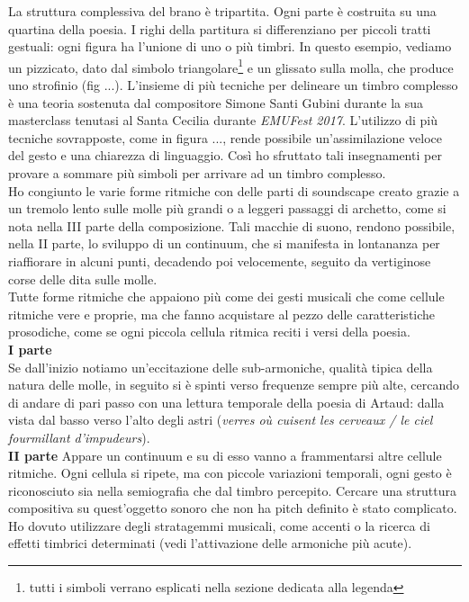 La struttura complessiva del brano è tripartita. Ogni parte è costruita su una quartina della poesia. I righi della partitura  si differenziano per piccoli tratti gestuali: ogni figura ha l'unione di uno o più timbri. In questo esempio, vediamo un pizzicato, dato dal simbolo triangolare\footnote{tutti i simboli verrano esplicati nella sezione dedicata alla legenda} e un glissato sulla molla, che produce uno strofinio (fig ...). L'insieme di più tecniche per delineare un timbro complesso è una teoria sostenuta dal compositore Simone Santi Gubini durante la sua masterclass tenutasi al Santa Cecilia durante \textit{EMUFest 2017}. L'utilizzo di più tecniche sovrapposte, come in figura ..., rende possibile un'assimilazione veloce del gesto e una chiarezza di linguaggio. Così ho sfruttato tali insegnamenti per provare a sommare più simboli per arrivare ad un timbro complesso. \\
Ho congiunto le varie forme ritmiche con delle parti di soundscape creato grazie a un tremolo lento sulle molle più grandi o a leggeri passaggi di archetto, come si nota nella III parte della composizione. Tali macchie di suono, rendono possibile, nella II parte, lo sviluppo di un continuum, che si manifesta in lontananza per riaffiorare in alcuni punti, decadendo poi velocemente, seguito da vertiginose corse delle dita sulle molle. \\
Tutte forme ritmiche che appaiono più come dei gesti musicali che come cellule ritmiche vere e proprie, ma che fanno acquistare al pezzo delle caratteristiche prosodiche, come se ogni piccola cellula ritmica reciti i versi della poesia. \\
\textbf{I parte} \\
Se dall'inizio notiamo un'eccitazione delle sub-armoniche, qualità tipica della natura delle molle, in seguito si è spinti verso frequenze sempre più alte, cercando di andare di pari passo con una lettura temporale della poesia di Artaud: dalla vista dal basso verso l'alto degli astri (\textit{verres où cuisent les cerveaux / le ciel fourmillant d'impudeurs}). \\
\textbf{II parte}
Appare un continuum e su di esso vanno a frammentarsi altre cellule ritmiche. Ogni cellula si ripete, ma con piccole variazioni temporali, ogni gesto è riconosciuto sia nella semiografia che dal timbro percepito.
Cercare una struttura compositiva su quest'oggetto sonoro che non ha pitch definito è stato complicato. Ho dovuto utilizzare degli stratagemmi musicali, come accenti o la ricerca di effetti timbrici determinati (vedi l'attivazione delle armoniche più acute).
